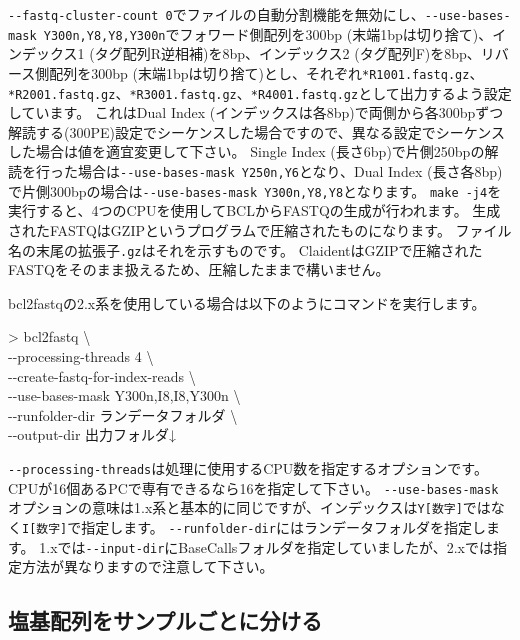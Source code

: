 \documentclass[titlepage,10pt,a4paper]{jsbook}
\newenvironment{cmd}{\begin{oframed}\raggedright\ttfamily\footnotesize\setlength{\baselineskip}{1.4em}}{\end{oframed}\vspace{-1em}}
\begin{document}
\texttt{{-}{-}fastq-cluster-count 0}でファイルの自動分割機能を無効にし、\texttt{{-}{-}use-bases-mask Y300n,Y8,Y8,Y300n}でフォワード側配列を300bp (末端1bpは切り捨て)、インデックス1 (タグ配列R逆相補)を8bp、インデックス2 (タグ配列F)を8bp、リバース側配列を300bp (末端1bpは切り捨て)とし、それぞれ\texttt{*{\textunderscore}R1{\textunderscore}001.fastq.gz}、\texttt{*{\textunderscore}R2{\textunderscore}001.fastq.gz}、\texttt{*{\textunderscore}R3{\textunderscore}001.fastq.gz}、\texttt{*{\textunderscore}R4{\textunderscore}001.fastq.gz}として出力するよう設定しています。
これはDual Index (インデックスは各8bp)で両側から各300bpずつ解読する(300PE)設定でシーケンスした場合ですので、異なる設定でシーケンスした場合は値を適宜変更して下さい。
Single Index (長さ6bp)で片側250bpの解読を行った場合は\texttt{{-}{-}use-bases-mask Y250n,Y6}となり、Dual Index (長さ各8bp)で片側300bpの場合は\texttt{{-}{-}use-bases-mask Y300n,Y8,Y8}となります。
\texttt{make -j4}を実行すると、4つのCPUを使用してBCLからFASTQの生成が行われます。
生成されたFASTQはGZIPというプログラムで圧縮されたものになります。
ファイル名の末尾の拡張子\texttt{.gz}はそれを示すものです。
ClaidentはGZIPで圧縮されたFASTQをそのまま扱えるため、圧縮したままで構いません。

bcl2fastqの2.x系を使用している場合は以下のようにコマンドを実行します。

\begin{cmd}
{\textgreater} bcl2fastq {\textbackslash}\\
{-}{-}processing-threads 4 {\textbackslash}\\
{-}{-}create-fastq-for-index-reads {\textbackslash}\\
{-}{-}use-bases-mask Y300n,I8,I8,Y300n {\textbackslash}\\
{-}{-}runfolder-dir ランデータフォルダ {\textbackslash}\\
{-}{-}output-dir 出力フォルダ↓
\end{cmd}

\texttt{{-}{-}processing-threads}は処理に使用するCPU数を指定するオプションです。
CPUが16個あるPCで専有できるなら16を指定して下さい。
\texttt{{-}{-}use-bases-mask}オプションの意味は1.x系と基本的に同じですが、インデックスは\texttt{Y[数字]}ではなく\texttt{I[数字]}で指定します。
\texttt{{-}{-}runfolder-dir}にはランデータフォルダを指定します。
1.xでは\texttt{{-}{-}input-dir}にBaseCallsフォルダを指定していましたが、2.xでは指定方法が異なりますので注意して下さい。

\subsection{塩基配列をサンプルごとに分ける}
\end{document}
